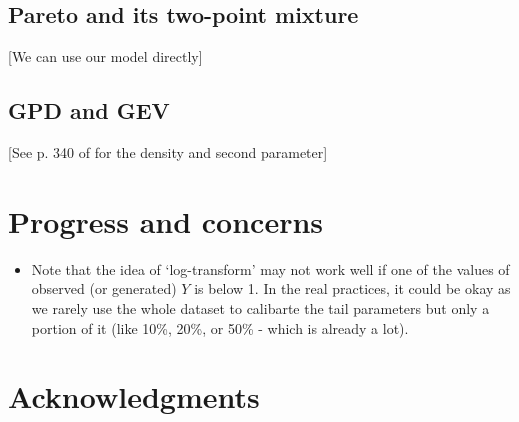\documentclass[11pt]{article}
\begin{document}
\subsection{Pareto and its two-point mixture}
[We can use our model directly]
\subsection{GPD and GEV}
[See p. 340 of \cite{Goege+Wet:12a} for the density and second parameter]


\section{Progress and concerns}

\begin{itemize}
\item Note that the idea of `log-transform' may not work well if one of the values of observed (or generated) $Y$ is below 1. In the real practices, it could be okay as we rarely use the whole dataset to calibarte the tail parameters but only a portion of it (like 10\%, 20\%, or 50\% - which is already a lot).
\end{itemize}

\section*{Acknowledgments}






\end{document}
